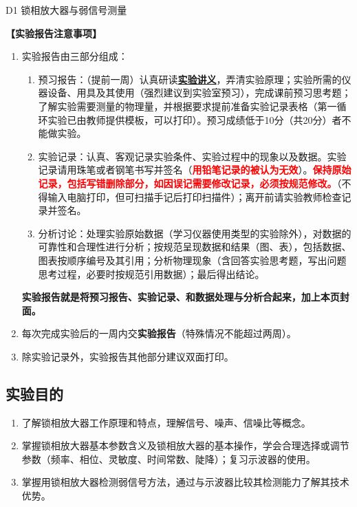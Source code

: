 \documentclass[dvipsnames, svgnames,a4paper,11pt]{article}
\begin{document}
\scoresTable{}{}{}{}{}{}{}{}


\begin{center}
	\LARGE D1 \quad 锁相放大器与弱信号测量
\end{center}

\textbf{【实验报告注意事项】}
\begin{enumerate}
	\item 实验报告由三部分组成：
	\begin{enumerate}
		\item 预习报告：（提前一周）认真研读\underline{\textbf{实验讲义}}，弄清实验原理；实验所需的仪器设备、用具及其使用（强烈建议到实验室预习），完成课前预习思考题；了解实验需要测量的物理量，并根据要求提前准备实验记录表格（第一循环实验已由教师提供模板，可以打印）。预习成绩低于10分（共20分）者不能做实验。
	    \item 实验记录：认真、客观记录实验条件、实验过程中的现象以及数据。实验记录请用珠笔或者钢笔书写并签名（\textcolor{red}{\textbf{用铅笔记录的被认为无效}}）。\textcolor{red}{\textbf{保持原始记录，包括写错删除部分，如因误记需要修改记录，必须按规范修改。}}（不得输入电脑打印，但可扫描手记后打印扫描件）；离开前请实验教师检查记录并签名。
	    \item 分析讨论：处理实验原始数据（学习仪器使用类型的实验除外），对数据的可靠性和合理性进行分析；按规范呈现数据和结果（图、表），包括数据、图表按顺序编号及其引用；分析物理现象（含回答实验思考题，写出问题思考过程，必要时按规范引用数据）；最后得出结论。
	\end{enumerate}
	\textbf{实验报告就是将预习报告、实验记录、和数据处理与分析合起来，加上本页封面。}
	\item 每次完成实验后的一周内交\textbf{实验报告}（特殊情况不能超过两周）。
	\item 除实验记录外，实验报告其他部分建议双面打印。
\end{enumerate}


\clearpage
\tableofcontents
\clearpage

\setcounter{section}{0}
	
\subsection{实验目的}
\begin{enumerate}
	\item 了解锁相放大器工作原理和特点，理解信号、噪声、信噪比等概念。
	\item  掌握锁相放大器基本参数含义及锁相放大器的基本操作，学会合理选择或调节参数（频率、相位、灵敏度、时间常数、陡降）；复习示波器的使用。
	\item 掌握用锁相放大器检测弱信号方法，通过与示波器比较其检测能力了解其技术优势。
\end{enumerate}
\end{document}

